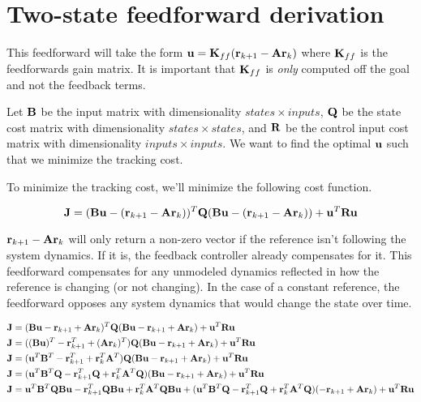 \chapter{Two-state feedforward derivation} \label{ch:app-two-state-ff-deriv}

This feedforward will take the form
$\mathbf{u} = \mathbf{K}_{ff} (\mathbf{r}_{k+1} - \mathbf{A}\mathbf{r}_k)$ where
$\mathbf{K}_{ff}$ is the feedforwards gain matrix. It is important that
$\mathbf{K}_{ff}$ is \textit{only} computed off the goal and not the feedback
terms.

Let $\mathbf{B}$ be the input matrix with dimensionality $states \times inputs$,
$\mathbf{Q}$ be the state cost matrix with dimensionality
$states \times states$, and $\mathbf{R}$ be the control input cost matrix with
dimensionality $inputs \times inputs$. We want to find the optimal $\mathbf{u}$
such that we minimize the tracking cost.

To minimize the tracking cost, we'll minimize the following cost function.

\begin{equation*}
  \mathbf{J} = (\mathbf{B}\mathbf{u} - (\mathbf{r}_{k+1} - \mathbf{A}\mathbf{r}_k))^T \mathbf{Q}
    (\mathbf{B}\mathbf{u} - (\mathbf{r}_{k+1} - \mathbf{A}\mathbf{r}_k)) +
    \mathbf{u}^T\mathbf{R}\mathbf{u}
\end{equation*}

$\mathbf{r}_{k+1} - \mathbf{A}\mathbf{r}_k$ will only return a non-zero vector if the
reference isn't following the system dynamics. If it is, the feedback controller
already compensates for it. This feedforward compensates for any unmodeled
dynamics reflected in how the reference is changing (or not changing). In the
case of a constant reference, the feedforward opposes any system dynamics that
would change the state over time.

\begin{align*}
  \mathbf{J} &= (\mathbf{B}\mathbf{u} - \mathbf{r}_{k+1} + \mathbf{A}\mathbf{r}_k)^T \mathbf{Q}
    (\mathbf{B}\mathbf{u} - \mathbf{r}_{k+1} + \mathbf{A}\mathbf{r}_k) +
    \mathbf{u}^T\mathbf{R}\mathbf{u} \\
  \mathbf{J} &= ((\mathbf{B}\mathbf{u})^T - \mathbf{r}_{k+1}^T + (\mathbf{A}\mathbf{r}_k)^T)
    \mathbf{Q}(\mathbf{B}\mathbf{u} - \mathbf{r}_{k+1} + \mathbf{A}\mathbf{r}_k) +
    \mathbf{u}^T\mathbf{R}\mathbf{u} \\
  \mathbf{J} &= (\mathbf{u}^T\mathbf{B}^T - \mathbf{r}_{k+1}^T + \mathbf{r}_k^T\mathbf{A}^T)
    \mathbf{Q}(\mathbf{B}\mathbf{u} - \mathbf{r}_{k+1} + \mathbf{A}\mathbf{r}_k) +
    \mathbf{u}^T\mathbf{R}\mathbf{u} \\
  \mathbf{J} &= (\mathbf{u}^T\mathbf{B}^T\mathbf{Q} - \mathbf{r}_{k+1}^T\mathbf{Q} +
    \mathbf{r}_k^T\mathbf{A}^T\mathbf{Q})(\mathbf{B}\mathbf{u} - \mathbf{r}_{k+1} +
    \mathbf{A}\mathbf{r}_k) + \mathbf{u}^T\mathbf{R}\mathbf{u} \\
  \mathbf{J} &= \mathbf{u}^T\mathbf{B}^T\mathbf{Q}\mathbf{B}\mathbf{u} -
    \mathbf{r}_{k+1}^T\mathbf{Q}\mathbf{B}\mathbf{u} +
    \mathbf{r}_k^T\mathbf{A}^T\mathbf{Q}\mathbf{B}\mathbf{u} + (\mathbf{u}^T\mathbf{B}^T\mathbf{Q} -
    \mathbf{r}_{k+1}^T\mathbf{Q} + \mathbf{r}_k^T\mathbf{A}^T\mathbf{Q})
    (-\mathbf{r}_{k+1} + \mathbf{A}\mathbf{r}_k) + \mathbf{u}^T\mathbf{R}\mathbf{u}
\end{align*}

